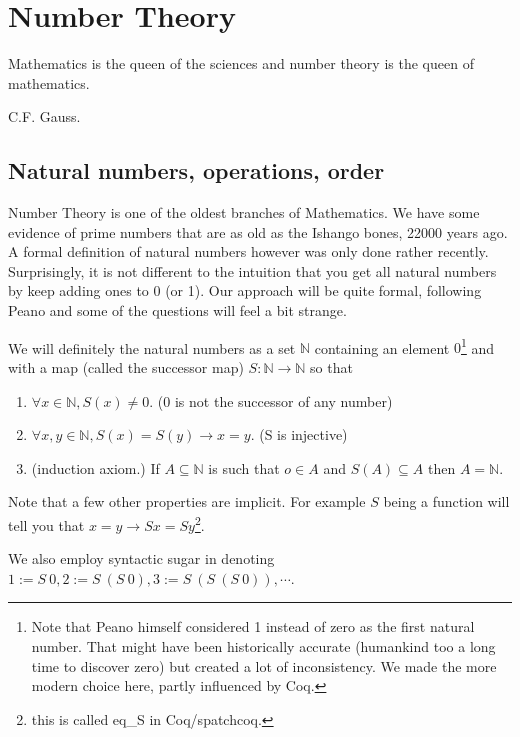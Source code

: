\chapter{Number Theory}\label{ch:numbers}
\epigraph{Mathematics is the queen of the sciences and number theory is the queen of mathematics.}{ C.F. Gauss.}

\section{Natural numbers, operations, order}

Number Theory is one of the oldest branches of Mathematics. We have some evidence of  prime numbers that are as old as the Ishango bones, 22000 years ago. A formal definition of natural numbers however was only done rather recently. Surprisingly, it is not different to the intuition that you get all natural numbers by keep adding ones to  0 (or 1). Our approach will be quite formal, following Peano  and some of the questions will feel a bit strange. 

We will definitely the natural numbers as a set $\mathbb{N}$ containing an element $0$\footnote{Note that Peano himself considered 1 instead of zero as the first natural number. That might have been historically accurate (humankind too a long time to discover zero) but created a lot of inconsistency. We made the more modern choice here, partly influenced by Coq.} and with a map (called the successor map) $S:\mathbb{N}\rightarrow \mathbb{N}$ so that 


\begin{enumerate}


\item $\forall x \in \mathbb{N}, S(x)\ne 0$. (0 is not the successor of any number)

\item $\forall x, y \in \mathbb{N}, S(x)=S(y)\rightarrow x=y$. (S is injective)

\item  (induction axiom.) If $A\subseteq \mathbb{N}$ is such that $o \in A$ and $S(A) \subseteq A$ then $A=\mathbb{N}$.
\end{enumerate}

Note that a few other properties are implicit. For example $S$ being a function will tell you that $x=y \rightarrow  S x = S y$\footnote{ this is called eq\_S in Coq/spatchcoq.}. 

We also employ syntactic sugar in denoting $1:=S\  0, 2:= S\  (S\  0), 3:= S\ ( S\  (S\ 0 )), \cdots$.


